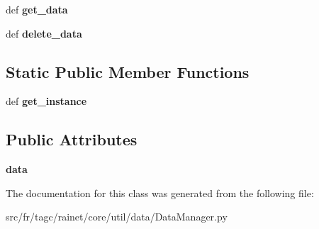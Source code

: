 \begin{DoxyCompactItemize}
\item 
\hypertarget{classsrc_1_1fr_1_1tagc_1_1rainet_1_1core_1_1util_1_1data_1_1DataManager_1_1DataManager_aa1f82f1f0245b678dd6dbcba59f26eaa}{def {\bfseries get\-\_\-data}}\label{classsrc_1_1fr_1_1tagc_1_1rainet_1_1core_1_1util_1_1data_1_1DataManager_1_1DataManager_aa1f82f1f0245b678dd6dbcba59f26eaa}

\item 
\hypertarget{classsrc_1_1fr_1_1tagc_1_1rainet_1_1core_1_1util_1_1data_1_1DataManager_1_1DataManager_a5350a35b0602af140ab388e32a3f6f33}{def {\bfseries delete\-\_\-data}}\label{classsrc_1_1fr_1_1tagc_1_1rainet_1_1core_1_1util_1_1data_1_1DataManager_1_1DataManager_a5350a35b0602af140ab388e32a3f6f33}

\end{DoxyCompactItemize}
\subsection*{Static Public Member Functions}
\begin{DoxyCompactItemize}
\item 
\hypertarget{classsrc_1_1fr_1_1tagc_1_1rainet_1_1core_1_1util_1_1data_1_1DataManager_1_1DataManager_a750e63d4224d22065d333274a802bf22}{def {\bfseries get\-\_\-instance}}\label{classsrc_1_1fr_1_1tagc_1_1rainet_1_1core_1_1util_1_1data_1_1DataManager_1_1DataManager_a750e63d4224d22065d333274a802bf22}

\end{DoxyCompactItemize}
\subsection*{Public Attributes}
\begin{DoxyCompactItemize}
\item 
\hypertarget{classsrc_1_1fr_1_1tagc_1_1rainet_1_1core_1_1util_1_1data_1_1DataManager_1_1DataManager_a1869259f0c617d63a58ac8fbad135e55}{{\bfseries data}}\label{classsrc_1_1fr_1_1tagc_1_1rainet_1_1core_1_1util_1_1data_1_1DataManager_1_1DataManager_a1869259f0c617d63a58ac8fbad135e55}

\end{DoxyCompactItemize}


The documentation for this class was generated from the following file\-:\begin{DoxyCompactItemize}
\item 
src/fr/tagc/rainet/core/util/data/Data\-Manager.\-py\end{DoxyCompactItemize}
